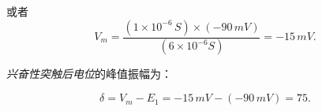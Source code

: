 或者
\begin{equation}\label{eq:12_substituting_V_m_2}
	V_m = 
	\frac{
		(1 \times 10^{-6} \, \textit{S})
		\times
		(-90 \, \textit{mV})
	}{
		(6 \times 10^{-6} \textit{S})
	}
	= -15 \, \textit{mV}.
\end{equation}


\textit{兴奋性突触后电位}的峰值振幅为：

\begin{equation}\label{peak_amplitude}
	\delta = V_m - E_1 = -15 \, \textit{mV} - (-90 \, \textit{mV}) = 75.
\end{equation}


